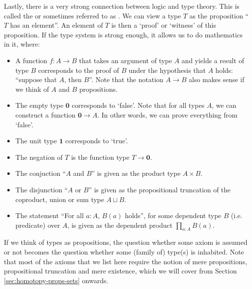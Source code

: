 Lastly, there is a very strong connection between logic and type theory. This is called the  or sometimes referred to as . We can view a type $ T $ as the proposition ``$ T $ has an element''. An element of $ T $ is then a `proof' or `witness' of this proposition. If the type system is strong enough, it allows us to do mathematics in it, where:
\begin{itemize}
  \item A function $ f: A \to B $ that takes an argument of type $ A $ and yields a result of type $ B $ corresponds to the proof of $ B $ under the hypothesis that $ A $ holds: ``suppose that $ A $, then $ B $''. Note that the notation $ A \to B $ also makes sense if we think of $ A $ and $ B $ propositions.
  \item The empty type $ \mathbf 0 $ corresponds to `false'. Note that for all types $ A $, we can construct a function $ \mathbf 0 \to A $. In other words, we can prove everything from `false'.
  \item The unit type $ \mathbf 1 $ corresponds to `true'.
  \item The negation of $ T $ is the function type $ T \to \mathbf 0 $.
  \item The conjuction ``$ A $ and $ B $'' is given as the product type $ A \times B $.
  \item The disjunction ``$ A $ or $ B $'' is given as the propositional truncation of the coproduct, union or sum type $ A \sqcup B $.
  \item The statement ``For all $ a: A $, $ B(a) $ holds'', for some dependent type $ B $ (i.e. predicate) over $ A $, is given as the dependent product $ \prod_{a: A} B(a) $.
\end{itemize}
If we think of types as propositions, the question whether some axiom is assumed or not becomes the question whether some (family of) type(s) is inhabited. Note that most of the axioms that we list here require the notion of mere propositions, propositional truncation and mere existence, which we will cover from Section \ref{sec:homotopy-props-sets} onwards.
